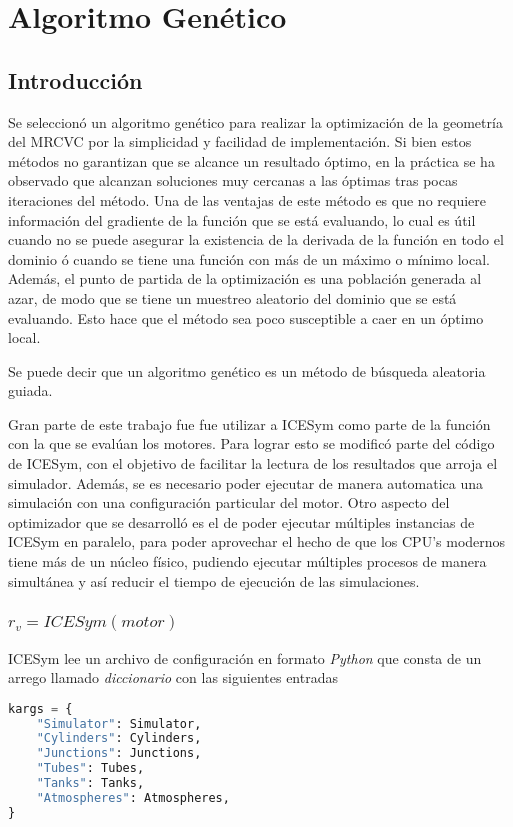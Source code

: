 \chapter{Algoritmo Genético}

\section{Introducción}
%
Se seleccionó un algoritmo genético para realizar la optimización de la
geometría del MRCVC por la simplicidad y facilidad de implementación.
%
Si bien estos métodos no garantizan que se alcance un resultado óptimo, en la
práctica\cite{goldberg}\cite{shi} se ha observado que alcanzan soluciones muy
cercanas a las óptimas tras pocas iteraciones del método.
%
Una de las ventajas de este método es que no requiere información del gradiente
de la función que se está evaluando, lo cual es útil cuando no se puede
asegurar la existencia de la derivada de la función en todo el dominio ó cuando
se tiene una función con más de un máximo o mínimo local.
%
Además, el punto de partida de la optimización es una población generada al
azar, de modo que se tiene un muestreo aleatorio del dominio que se está
evaluando.
%
Esto hace que el método sea poco susceptible a caer en un óptimo local.

Se puede decir que un algoritmo genético es un método de búsqueda aleatoria
guiada.
%

Gran parte de este trabajo fue fue utilizar a ICESym como parte de la función
con la que se evalúan los motores.
%
Para lograr esto se modificó parte del código de ICESym, con el objetivo de
facilitar la lectura de los resultados que arroja el simulador.
%
Además, se es necesario poder ejecutar de manera automatica una simulación con
una configuración particular del motor.
%
Otro aspecto del optimizador que se desarrolló es el de poder ejecutar
múltiples instancias de ICESym en paralelo, para poder aprovechar el hecho de
que los CPU's modernos tiene más de un núcleo físico, pudiendo ejecutar
múltiples procesos de manera simultánea y así reducir el tiempo de ejecución de
las simulaciones. 
%

\subsection{$r_v = ICESym(motor)$}
%
ICESym lee un archivo de configuración en formato \emph{Python} que consta de
un arrego llamado \emph{diccionario} con las siguientes entradas

\begin{lstlisting}[language=Python]
kargs = {
    "Simulator": Simulator,
    "Cylinders": Cylinders,
    "Junctions": Junctions,
    "Tubes": Tubes,
    "Tanks": Tanks,
    "Atmospheres": Atmospheres,
}
\end{lstlisting}


